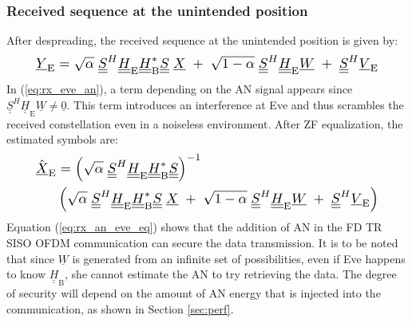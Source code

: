 \documentclass[a4paper,11pt]{article}
\def\uu#1{\underline{\underline{#1}}}
\begin{document}
\subsubsection{Received sequence at the unintended position}
After despreading, the received sequence at the unintended position is given by:
\begin{equation}
\resizebox{0.89\hsize}{!}{$
    \underline{Y}_{\text{E}} = \sqrt{\alpha} \; \underline{\underline{S}}^H \underline{\underline{H}}_{\text{E}} \underline{\underline{H}}^*_{\text{B}} \underline{\underline{S}}\; \underline{X} \; +  \; \sqrt{1-\alpha} \; \underline{\underline{S}}^H \underline{\underline{H}}_{\text{E}} \underline{W}  \; +  \; \underline{\underline{S}}^H  \underline{V}_\text{E} $}
    \label{eq:rx_eve_an}
\end{equation}
In (\ref{eq:rx_eve_an}), a term depending on the AN signal appears since $ \underline{\underline{S}}^H\underline{\underline{H}}_{\text{E}} \underline{W} \neq \underline{0}$. This term introduces an interference at Eve and thus scrambles the received constellation even in a noiseless environment. After ZF equalization, the estimated symbols are:
\begin{equation}
\resizebox{0.89\hsize}{!}{$
    \begin{split}
         \hat{\underline{X}}_{\text{E}} &= \left( \sqrt{\alpha} \; \underline{\underline{S}}^H \underline{\underline{H}}_{\text{E}} \underline{\underline{H}}^*_{\text{B}} \underline{\underline{S}} \right)^{-1} \\
         & \left( \sqrt{\alpha} \;\underline{\underline{S}}^H \underline{\underline{H}}_{\text{E}} \underline{\underline{H}}^*_{\text{B}} \underline{\underline{S}}\; \underline{X} \; +  \; \sqrt{1-\alpha} \; \underline{\underline{S}}^H \underline{\underline{H}}_{\text{E}} \underline{W}  \; +  \; \underline{\underline{S}}^H  \underline{V}_\text{E}  \right)
    \end{split}$}
    \label{eq:rx_an_eve_eq}
\end{equation}
Equation (\ref{eq:rx_an_eve_eq}) shows that the addition of AN in the FD TR SISO OFDM communication can secure the data transmission. It is to be noted that since $\underline{W}$ is generated from an infinite set of possibilities, even if Eve happens to know $\uu{H}_{\text{B}}$, she cannot estimate the AN to try retrieving the data.  The degree of security will depend on the amount of AN energy that is injected into the communication, as shown in Section \ref{sec:perf}.
\end{document}
